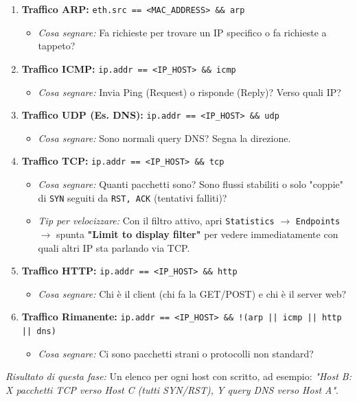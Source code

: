 \documentclass[12pt,a4paper]{report}
\begin{document}
	\begin{enumerate}
		\item \textbf{Traffico ARP:} \texttt{eth.src == <MAC\_ADDRESS> \&\& arp} 
		\begin{itemize}
			\item \textit{Cosa segnare:} Fa richieste per trovare un IP specifico o fa richieste a tappeto?
		\end{itemize}
		\item \textbf{Traffico ICMP:} \texttt{ip.addr == <IP\_HOST> \&\& icmp}
		\begin{itemize}
			\item \textit{Cosa segnare:} Invia Ping (Request) o risponde (Reply)? Verso quali IP?
		\end{itemize}
		\item \textbf{Traffico UDP (Es. DNS):} \texttt{ip.addr == <IP\_HOST> \&\& udp}
		\begin{itemize}
			\item \textit{Cosa segnare:} Sono normali query DNS? Segna la direzione.
		\end{itemize}
		\item \textbf{Traffico TCP:} \texttt{ip.addr == <IP\_HOST> \&\& tcp}
		\begin{itemize}
			\item \textit{Cosa segnare:} Quanti pacchetti sono? Sono flussi stabiliti o solo "coppie" di \texttt{SYN} seguiti da \texttt{RST, ACK} (tentativi falliti)?
			\item \textit{Tip per velocizzare:} Con il filtro attivo, apri \texttt{Statistics} $\rightarrow$ \texttt{Endpoints} $\rightarrow$ spunta \textbf{"Limit to display filter"} per vedere immediatamente con quali altri IP sta parlando via TCP.
		\end{itemize}
		\item \textbf{Traffico HTTP:} \texttt{ip.addr == <IP\_HOST> \&\& http}
		\begin{itemize}
			\item \textit{Cosa segnare:} Chi è il client (chi fa la GET/POST) e chi è il server web?
		\end{itemize}
		\item \textbf{Traffico Rimanente:} \texttt{ip.addr == <IP\_HOST> \&\& !(arp || icmp || http || dns)}
		\begin{itemize}
			\item \textit{Cosa segnare:} Ci sono pacchetti strani o protocolli non standard?
		\end{itemize}
	\end{enumerate}
	\textit{Risultato di questa fase:} Un elenco per ogni host con scritto, ad esempio: \textit{"Host B: X pacchetti TCP verso Host C (tutti SYN/RST), Y query DNS verso Host A"}.
	
\end{document}
